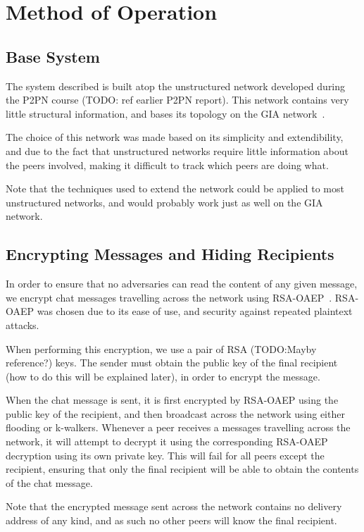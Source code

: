 \section{Method of Operation}

\subsection{Base System}

The system described is built atop the unstructured network developed during the P2PN course (TODO: ref earlier P2PN report). This network contains very little structural information, and bases its topology on the GIA network~\citep{GIA}.

The choice of this network was made based on its simplicity and extendibility, and due to the fact that unstructured networks require little information about the peers involved, making it difficult to track which peers are doing what. 

Note that the techniques used to extend the network could be applied to most unstructured networks, and would probably work just as well on the GIA network.

\subsection{Encrypting Messages and Hiding Recipients}

In order to ensure that no adversaries can read the content of any given message, we encrypt chat messages travelling across the network using RSA-OAEP~\citep{OAEP}. RSA-OAEP was chosen due to its ease of use, and security against repeated plaintext attacks.

When performing this encryption, we use a pair of RSA (TODO:Mayby reference?) keys. The sender must obtain the public key of the final recipient (how to do this will be explained later), in order to encrypt the message.

When the chat message is sent, it is first encrypted by RSA-OAEP using the public key of the recipient, and then broadcast across the network using either flooding or k-walkers. Whenever a peer receives a messages travelling across the network, it will attempt to decrypt it using the corresponding RSA-OAEP decryption using its own private key. This will fail for all peers except the recipient, ensuring that only the final recipient will be able to obtain the contents of the chat message.

Note that the encrypted message sent across the network contains no delivery address of any kind, and as such no other peers will know the final recipient.

